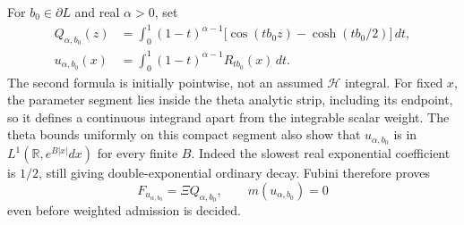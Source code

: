 \documentclass[11pt,a4paper]{article}
\numberwithin{equation}{section}
\theoremstyle{definition}\newtheorem{definition}[theorem]{Definition}
\theoremstyle{remark}\newtheorem{remark}[theorem]{Remark}
\newcommand{\R}{\mathbb R}\newcommand{\C}{\mathbb C}\newcommand{\N}{\mathbb N}
\newcommand{\Hh}{\mathcal H}\newcommand{\Hw}{\mathcal H}
\begin{document}
For $b_0\in\partial L$ and real $\alpha>0$, set
\begin{align}
 Q_{\alpha,b_0}(z)
 &=\int_0^1(1-t)^{\alpha-1}
       \bigl[\cos(tb_0z)-\cosh(tb_0/2)\bigr]\,dt,\label{d:eq:boundary-quotient}\\
 u_{\alpha,b_0}(x)
 &=\int_0^1(1-t)^{\alpha-1}R_{tb_0}(x)\,dt.\label{d:eq:boundary-source}
\end{align}
The second formula is initially pointwise, not an assumed $\Hh$ integral. For fixed $x$, the parameter segment lies inside the theta analytic strip, including its endpoint, so it defines a continuous integrand apart from the integrable scalar weight. The theta bounds uniformly on this compact segment also show that $u_{\alpha,b_0}$ is in $L^1(\R,e^{B|x|}dx)$ for every finite $B$. Indeed the slowest real exponential coefficient is $1/2$, still giving double-exponential ordinary decay. Fubini therefore proves
\begin{equation}\label{d:eq:boundary-transform}
 F_{u_{\alpha,b_0}}=\Xi Q_{\alpha,b_0},\qquad m(u_{\alpha,b_0})=0
\end{equation}
even before weighted admission is decided.
\end{document}
